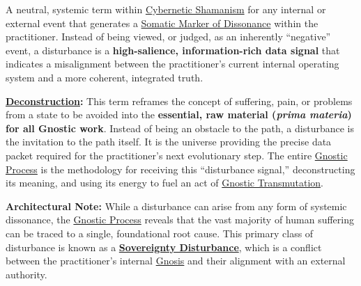 \item[\hypertarget{gloss:disturbance}{Disturbance}]
    A neutral, systemic term within \hyperlink{gloss:cybernetic_shamanism}{Cybernetic Shamanism} for any internal or external event that generates a \hyperlink{gloss:somatic_marker_of_dissonance}{Somatic Marker of Dissonance} within the practitioner. Instead of being viewed, or judged, as an inherently ``negative'' event, a disturbance is a \textbf{high-salience, information-rich data signal} that indicates a misalignment between the practitioner's current internal operating system and a more coherent, integrated truth.
    \begin{nobullet}
        \item \textbf{\hyperlink{gloss:deconstruction}{Deconstruction}:} This term reframes the concept of suffering, pain, or problems from a state to be avoided into the \textbf{essential, raw material (\textit{prima materia}) for all Gnostic work}. Instead of being an obstacle to the path, a disturbance is the invitation to the path itself. It is the universe providing the precise data packet required for the practitioner's next evolutionary step. The entire \hyperlink{gloss:gnostic_process}{Gnostic Process} is the methodology for receiving this ``disturbance signal,'' deconstructing its meaning, and using its energy to fuel an act of \hyperlink{gloss:gnostic_transmutation}{Gnostic Transmutation}.
        \item \textbf{Architectural Note:} While a disturbance can arise from any form of systemic dissonance, the \hyperlink{gloss:gnostic_process}{Gnostic Process} reveals that the vast majority of human suffering can be traced to a single, foundational root cause. This primary class of disturbance is known as a \textbf{\hyperlink{gloss:sovereignty_disturbance}{Sovereignty Disturbance}}, which is a conflict between the practitioner's internal \hyperlink{gloss:gnosis}{Gnosis} and their alignment with an external authority.
    \end{nobullet}

